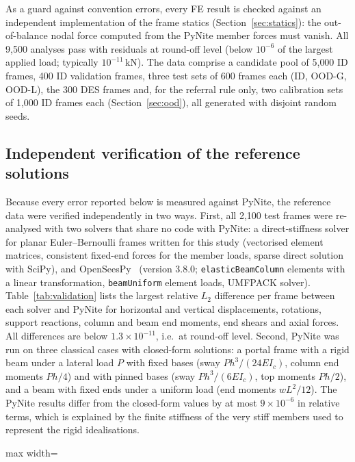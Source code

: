 As a guard against convention errors, every FE result is checked against an independent implementation of the frame statics (Section~\ref{sec:statics}): the out-of-balance nodal force computed from the PyNite member forces must vanish. All 9{,}500 analyses pass with residuals at round-off level (below $10^{-6}$ of the largest applied load; typically $10^{-11}$\,kN). The data comprise a candidate pool of 5{,}000 ID frames, 400 ID validation frames, three test sets of 600 frames each (ID, OOD-G, OOD-L), the 300 DES frames and, for the referral rule only, two calibration sets of 1{,}000 ID frames each (Section~\ref{sec:ood}), all generated with disjoint random seeds.

\subsection{Independent verification of the reference solutions}\label{sec:validation}
Because every error reported below is measured against PyNite, the reference data were verified independently in two ways. First, all 2{,}100 test frames were re-analysed with two solvers that share no code with PyNite: a direct-stiffness solver for planar Euler--Bernoulli frames written for this study (vectorised element matrices, consistent fixed-end forces for the member loads, sparse direct solution with SciPy), and OpenSeesPy~\cite{zhu2018openseespy} (version 3.8.0; \texttt{elasticBeamColumn} elements with a linear transformation, \texttt{beamUniform} element loads, UMFPACK solver). Table~\ref{tab:validation} lists the largest relative $L_2$ difference per frame between each solver and PyNite for horizontal and vertical displacements, rotations, support reactions, column and beam end moments, end shears and axial forces. All differences are below $1.3\times10^{-11}$, i.e.\ at round-off level. Second, PyNite was run on three classical cases with closed-form solutions: a portal frame with a rigid beam under a lateral load $P$ with fixed bases (sway $Ph^3/(24EI_c)$, column end moments $Ph/4$) and with pinned bases (sway $Ph^3/(6EI_c)$, top moments $Ph/2$), and a beam with fixed ends under a uniform load (end moments $wL^2/12$). The PyNite results differ from the closed-form values by at most $9\times10^{-6}$ in relative terms, which is explained by the finite stiffness of the very stiff members used to represent the rigid idealisations.

\begin{table}[t]
\centering
\caption{Independent verification of the PyNite reference solutions. Top: largest relative $L_2$ difference per frame between each solver and PyNite over every frame of each test set. Bottom: closed-form benchmarks analysed with PyNite.}\label{tab:validation}
\footnotesize
\begin{adjustbox}{max width=\textwidth}
\end{adjustbox}
\end{table}

